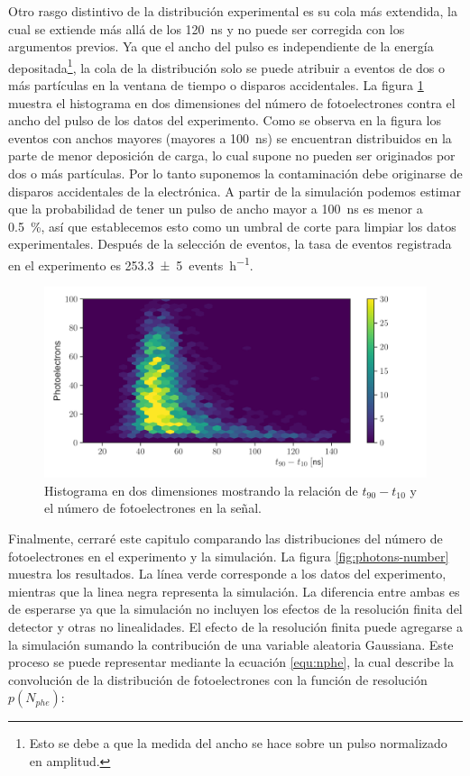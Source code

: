Otro rasgo distintivo de la distribución experimental es su cola más extendida, la cual se extiende más allá de los \SI{120}{\ns} y no puede ser corregida con los argumentos previos. Ya que el ancho del pulso es independiente de la energía depositada\footnote{Esto se debe a que la medida del ancho se hace sobre un pulso normalizado en amplitud.}, la cola de la distribución solo se puede atribuir a eventos de dos o más partículas en la ventana de tiempo o disparos accidentales. La figura \ref{fig:qtime-dist} muestra el histograma en dos dimensiones del número de fotoelectrones contra el ancho del pulso de los datos del experimento. Como se observa en la figura los eventos con anchos mayores (mayores a \SI{100}{\ns}) se encuentran distribuidos en la parte de menor deposición de carga, lo cual supone no pueden ser originados por dos o más partículas. Por lo tanto suponemos la contaminación debe originarse de disparos accidentales de la electrónica. A partir de la simulación podemos estimar que la probabilidad de tener un pulso de ancho mayor a \SI{100}{\ns} es menor a \SI{0.5}{\percent}, así que establecemos esto como un umbral de corte para limpiar los datos experimentales. Después de la selección de eventos, la tasa de eventos registrada en el experimento es \SI{253.3(50)}{events\per\hour}.

\begin{figure}
        \centering
        \includegraphics[width=\textwidth]{qtime-dist.pdf}
        \caption{Histograma en dos dimensiones mostrando la relación de $t_{90}-t_{10}$ y el número de fotoelectrones en la señal.}
        \label{fig:qtime-dist}
\end{figure}

Finalmente, cerraré este capitulo comparando las distribuciones del número de fotoelectrones en el experimento y la simulación. La figura \ref{fig:photons-number} muestra los resultados. La línea verde corresponde a los datos del experimento, mientras que la linea negra representa la simulación. La diferencia entre ambas es de esperarse ya que la simulación no incluyen los efectos de la resolución finita del detector y otras no linealidades. El efecto de la resolución finita puede agregarse a la simulación sumando la contribución de una variable aleatoria Gaussiana. Este proceso se puede representar mediante la ecuación \ref{equ:nphe}, la cual describe la convolución de la distribución de fotoelectrones con la función de resolución $p(N_{phe})$:

